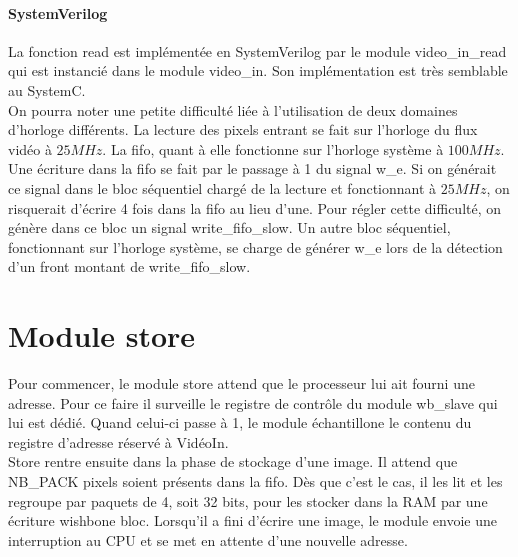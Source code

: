 \documentclass[a4paper,12pt]{report}
\begin{document}
{{                               \paragraph{SystemVerilog}
                               La fonction read est implémentée en SystemVerilog par le module video\_in\_read qui est instancié dans le module video\_in.
                               Son implémentation est très semblable au SystemC.\\
                               On pourra noter une petite difficulté liée à l'utilisation de deux domaines d'horloge différents.
                               La lecture des pixels entrant se fait sur l'horloge du flux vidéo à $25MHz$.
                               La fifo, quant à elle fonctionne sur l'horloge système à $100MHz$.
                               Une écriture dans la fifo se fait par le passage à 1 du signal w\_e.
                               Si on générait ce signal dans le bloc séquentiel chargé de la lecture et fonctionnant à $25MHz$,
                               on risquerait d'écrire 4 fois dans la fifo au lieu d'une.
                               Pour régler cette difficulté, on génère dans ce bloc un signal write\_fifo\_slow.
                               Un autre bloc séquentiel, fonctionnant sur l'horloge système, se charge de générer w\_e lors de la
                               détection d'un front montant de write\_fifo\_slow.


                               \section*{Module store}
                               Pour commencer, le module store attend que le processeur lui ait fourni une adresse. Pour ce faire il surveille le registre de contrôle du module wb\_slave
                               qui lui est dédié. Quand celui-ci passe à 1, le module échantillone le contenu du registre d'adresse réservé à VidéoIn. \\
                               Store rentre ensuite dans la phase de stockage d'une image.
                               Il attend que NB\_PACK pixels soient présents dans la fifo. Dès que c'est le cas, il les lit et les regroupe par paquets de 4, soit 32 bits,
                               pour les stocker dans la RAM par une écriture wishbone bloc.
                               Lorsqu'il a fini d'écrire une image, le module envoie une interruption au CPU et se met en attente d'une nouvelle adresse.

}}
\end{document}
